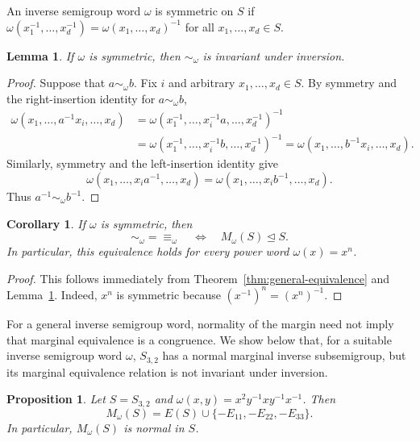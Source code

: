 \documentclass[11pt,a4paper,reqno]{amsart}
\newtheorem{corollary}[theorem]{Corollary}
\newtheorem{lemma}[theorem]{Lemma}
\newtheorem{proposition}[theorem]{Proposition}
\numberwithin{equation}{section}
\begin{document}
An inverse semigroup word $\omega$ is symmetric on $S$ if $\omega(x_1^{-1},\ldots,x_d^{-1})=\omega(x_1,\ldots,x_d)^{-1}$ for all $x_1,\ldots,x_d\in S$.


\begin{lemma}\label{lem:symmetric-inversion}
If $\omega$ is symmetric, then $\sim_\omega$ is invariant under inversion.
\end{lemma}
\begin{proof}
Suppose that $a\sim_\omega b$. Fix $i$ and arbitrary $x_1,\ldots,x_d\in S$. By symmetry and the right-insertion identity for $a\sim_\omega b$,
\[
\begin{aligned}
\omega(x_1,\ldots,a^{-1}x_i,\ldots,x_d) & =\omega(x_1^{-1},\ldots,x_i^{-1}a,\ldots,x_d^{-1})^{-1}\\
&=\omega(x_1^{-1},\ldots,x_i^{-1}b,\ldots,x_d^{-1})^{-1}=\omega(x_1,\ldots,b^{-1}x_i,\ldots,x_d).
\end{aligned}
\]
Similarly, symmetry and the left-insertion identity give
\[
\omega(x_1,\ldots,x_i a^{-1},\ldots,x_d)=\omega(x_1,\ldots,x_i b^{-1},\ldots,x_d).
\]
Thus $a^{-1}\sim_\omega b^{-1}$.
\end{proof}


\begin{corollary}\label{cor:symmetric-normality} 
If $\omega$ is symmetric, then 
\[
\sim_\omega=\equiv_\omega  \quad\Longleftrightarrow\quad  M_\omega(S)\trianglelefteq S.
\]
In particular, this equivalence holds for every power word $\omega(x)=x^n$.
\end{corollary}
\begin{proof}
This follows immediately from Theorem~\ref{thm:general-equivalence} and Lemma~\ref{lem:symmetric-inversion}. Indeed, $x^n$ is symmetric because $(x^{-1})^n=(x^n)^{-1}$.
\end{proof}

For a general inverse semigroup word, normality of the margin need not imply that marginal equivalence is a congruence. We show below that, for a suitable inverse semigroup word $\omega$, $S_{3,2}$ has a normal marginal inverse subsemigroup, but its marginal equivalence relation is not invariant under inversion.


\begin{proposition}\label{prop:omega-margin}
Let $S=S_{3,2}$ and $\omega(x,y)=x^2y^{-1}xy^{-1}x^{-1}$. Then
\[
M_\omega(S)=E(S)\cup\{-E_{11},-E_{22},-E_{33}\}.
\]
In particular, $M_\omega(S)$ is normal in $S$.
\end{proposition}
\end{document}
